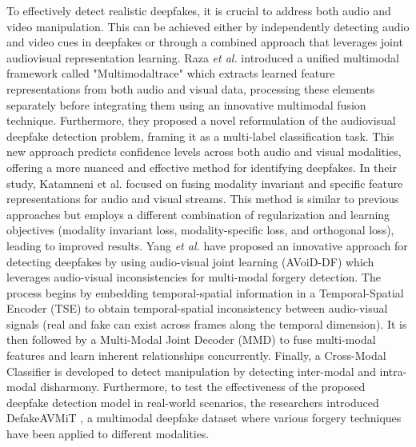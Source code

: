 To effectively detect realistic deepfakes, it is crucial to address both audio and video manipulation. This can be achieved either by independently detecting audio and video cues in deepfakes or through a combined approach that leverages joint audiovisual representation learning. Raza \textit{et al.} \cite{raza2023multimodaltrace} introduced a unified multimodal framework called "Multimodaltrace" which extracts learned feature representations from both audio and visual data, processing these elements separately before integrating them using an innovative multimodal fusion technique. Furthermore, they proposed a novel reformulation of the audiovisual deepfake detection problem, framing it as a multi-label classification task. This new approach predicts confidence levels across both audio and visual modalities, offering a more nuanced and effective method for identifying deepfakes. In their study, Katamneni et al.\cite{katamneni2023mis} focused on fusing modality invariant and specific feature representations for audio and visual streams. This method is similar to previous approaches but employs a different combination of regularization and learning objectives (modality invariant loss, modality-specific loss, and orthogonal loss), leading to improved results. Yang \textit{et al.} \cite{10081373} have proposed an innovative approach for detecting deepfakes by using audio-visual joint learning (AVoiD-DF) which leverages audio-visual inconsistencies for multi-modal forgery detection. The process begins by embedding temporal-spatial information in a Temporal-Spatial Encoder (TSE) to obtain temporal-spatial inconsistency between audio-visual signals (real and fake can exist across frames along the temporal dimension). It is then followed by a Multi-Modal Joint Decoder (MMD) to fuse multi-modal features and learn inherent relationships concurrently. Finally, a Cross-Modal Classifier is developed to detect manipulation by detecting inter-modal and intra-modal disharmony. Furthermore, to test the effectiveness of the proposed deepfake detection model in real-world scenarios, the researchers introduced DefakeAVMiT \cite{10081373}, a multimodal deepfake dataset where various forgery techniques have been applied to different modalities.

